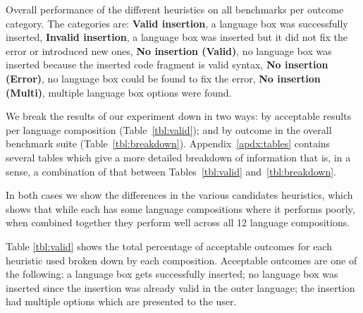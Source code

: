 \documentclass[sigplan,screen]{acmart}\settopmatter{printfolios=true,printccs=false,printacmref=false}
\begin{document}
\begin{table}[tb]
    

    \vspace{7pt}
    \caption{Overall performance of the different
    heuristics on all benchmarks per outcome category. The categories are:
    \textbf{Valid insertion}, a language box was successfully inserted, \textbf{Invalid insertion},
    a language box was inserted but it did not fix the error or introduced new
    ones, \textbf{No insertion (Valid)}, no language box was inserted because the inserted
    code fragment is valid syntax, \textbf{No insertion (Error)}, no language box could be
    found to fix the error, \textbf{No insertion (Multi)}, multiple language box options
    were found.}
    \label{tbl:breakdown}
\end{table}

We break the results of our experiment down in two ways: by acceptable results
per language composition (Table~\ref{tbl:valid}); and by outcome in the
overall benchmark suite (Table~\ref{tbl:breakdown}). Appendix~\ref{apdx:tables}
contains several tables which give a more detailed breakdown of information
that is, in a sense, a combination of that between Tables~\ref{tbl:valid}
and~\ref{tbl:breakdown}.

In both cases we show
the differences in the various candidates heuristics, which shows that while
each has some language compositions where it performs poorly, when combined
together they perform well across all 12 language compositions.

Table \ref{tbl:valid} shows the total percentage of
acceptable outcomes for each heuristic used broken down by each composition.
Acceptable outcomes are one of the following: a language box gets successfully
inserted; no language box was inserted since the insertion was already valid in
the outer language; the insertion had multiple options which are presented to
the user.
\end{document}
